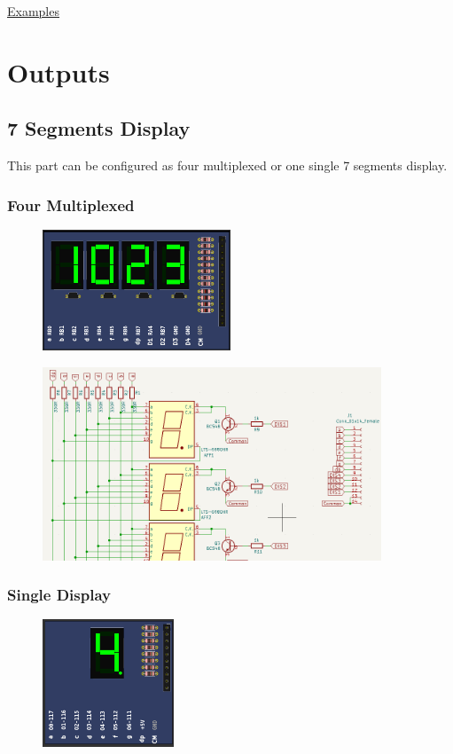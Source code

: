 \href{https://lcgamboa.github.io/picsimlab_examples/parts_Ultrasonic_HC-SR04.html}{Examples}



\section{Outputs}

\subsection{7 Segments Display}

This part can be configured as four multiplexed or one single 7 segments display.

\subsubsection{Four Multiplexed}
\begin{figure}[H]
\center
\includegraphics[width=0.5\textwidth]{img/part_7seg.png} 
\end{figure} 

\begin{figure}[H]
\center
\includegraphics[width=0.9\textwidth]{img/part_7seg_.png} 
\end{figure} 


\subsubsection{Single Display}
\begin{figure}[H]
\center
\includegraphics[width=0.35\textwidth]{img/part_7seg1.png} 
\end{figure} 

